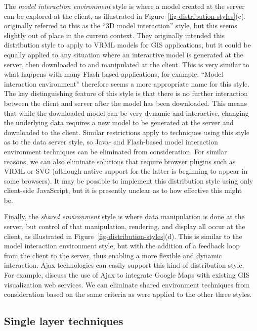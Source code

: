 \documentclass[acmtocl,acmnow]{acmtrans2m}
\begin{document}
The \emph{model interaction environment} style is where a model created
at the server can be explored at the client, as illustrated in
Figure~\ref{fig-distribution-styles}(c). 
originally referred to this as the ``3D model interaction'' style, but
this seems slightly out of place in the current context. They originally
intended this distribution style to apply to VRML models for GIS
applications, but it could be equally applied to any situation where an
interactive model is generated at the server, then downloaded to and
manipulated at the client. This is very similar to what happens with
many Flash-based applications, for example. ``Model interaction
environment'' therefore seems a more appropriate name for this style.
The key distinguishing feature of this style is that there is no further
interaction between the client and server after the model has been
downloaded. This means that while the downloaded model can be very
dynamic and interactive, changing the underlying data requires a new
model to be generated at the server and downloaded to the client.
Similar restrictions apply to techniques using this style as to the
data server style, so Java- and Flash-based model interaction
environment techniques can be eliminated from consideration. For similar
reasons, we can also eliminate solutions that require browser plugins
such as VRML or SVG (although native support for the latter is beginning
to appear in some browsers). It may be possible to implement this
distribution style using only client-side JavaScript, but it is presently
unclear as to how effective this might be.


Finally, the \emph{shared environment} style is where data manipulation
is done at the server, but control of that manipulation, rendering, and
display all occur at the client, as illustrated in
Figure~\ref{fig-distribution-styles}(d). This is similar to the model
interaction environment style, but with the addition of a feedback loop
from the client to the server, thus enabling a more flexible and dynamic
interaction. Ajax technologies \cite{Garr-JJ-2005-Ajax} can easily
support this kind of distribution style. For example,
 discuss the use of Ajax to integrate Google
Maps with existing GIS visualization web services. We can eliminate
shared environment techniques from consideration based on the same
criteria as were applied to the other three styles.


\subsection{Single layer techniques}
\label{sec-image-gen}
\end{document}
